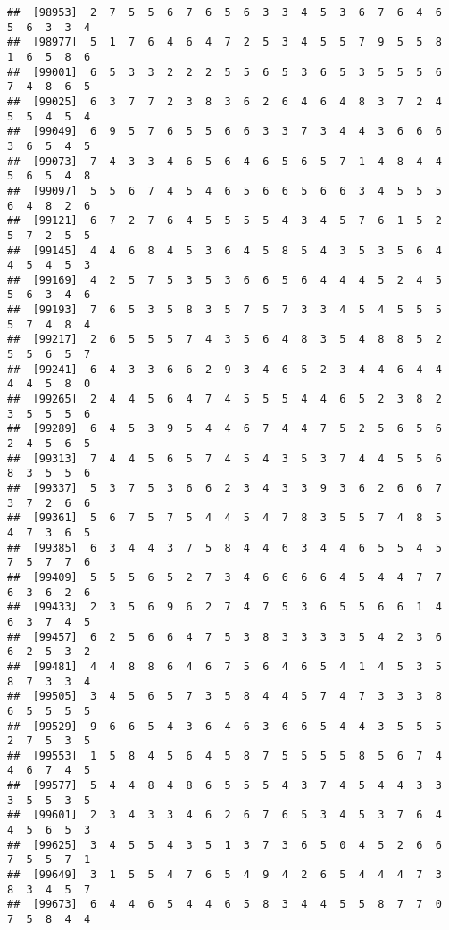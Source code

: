 \documentclass[
]{book}
\begin{document}
\begin{verbatim}
##  [98953]  2  7  5  5  6  7  6  5  6  3  3  4  5  3  6  7  6  4  6  5  6  3  3  4
##  [98977]  5  1  7  6  4  6  4  7  2  5  3  4  5  5  7  9  5  5  8  1  6  5  8  6
##  [99001]  6  5  3  3  2  2  2  5  5  6  5  3  6  5  3  5  5  5  6  7  4  8  6  5
##  [99025]  6  3  7  7  2  3  8  3  6  2  6  4  6  4  8  3  7  2  4  5  5  4  5  4
##  [99049]  6  9  5  7  6  5  5  6  6  3  3  7  3  4  4  3  6  6  6  3  6  5  4  5
##  [99073]  7  4  3  3  4  6  5  6  4  6  5  6  5  7  1  4  8  4  4  5  6  5  4  8
##  [99097]  5  5  6  7  4  5  4  6  5  6  6  5  6  6  3  4  5  5  5  6  4  8  2  6
##  [99121]  6  7  2  7  6  4  5  5  5  5  4  3  4  5  7  6  1  5  2  5  7  2  5  5
##  [99145]  4  4  6  8  4  5  3  6  4  5  8  5  4  3  5  3  5  6  4  4  5  4  5  3
##  [99169]  4  2  5  7  5  3  5  3  6  6  5  6  4  4  4  5  2  4  5  5  6  3  4  6
##  [99193]  7  6  5  3  5  8  3  5  7  5  7  3  3  4  5  4  5  5  5  5  7  4  8  4
##  [99217]  2  6  5  5  5  7  4  3  5  6  4  8  3  5  4  8  8  5  2  5  5  6  5  7
##  [99241]  6  4  3  3  6  6  2  9  3  4  6  5  2  3  4  4  6  4  4  4  4  5  8  0
##  [99265]  2  4  4  5  6  4  7  4  5  5  5  4  4  6  5  2  3  8  2  3  5  5  5  6
##  [99289]  6  4  5  3  9  5  4  4  6  7  4  4  7  5  2  5  6  5  6  2  4  5  6  5
##  [99313]  7  4  4  5  6  5  7  4  5  4  3  5  3  7  4  4  5  5  6  8  3  5  5  6
##  [99337]  5  3  7  5  3  6  6  2  3  4  3  3  9  3  6  2  6  6  7  3  7  2  6  6
##  [99361]  5  6  7  5  7  5  4  4  5  4  7  8  3  5  5  7  4  8  5  4  7  3  6  5
##  [99385]  6  3  4  4  3  7  5  8  4  4  6  3  4  4  6  5  5  4  5  7  5  7  7  6
##  [99409]  5  5  5  6  5  2  7  3  4  6  6  6  6  4  5  4  4  7  7  6  3  6  2  6
##  [99433]  2  3  5  6  9  6  2  7  4  7  5  3  6  5  5  6  6  1  4  6  3  7  4  5
##  [99457]  6  2  5  6  6  4  7  5  3  8  3  3  3  3  5  4  2  3  6  6  2  5  3  2
##  [99481]  4  4  8  8  6  4  6  7  5  6  4  6  5  4  1  4  5  3  5  8  7  3  3  4
##  [99505]  3  4  5  6  5  7  3  5  8  4  4  5  7  4  7  3  3  3  8  6  5  5  5  5
##  [99529]  9  6  6  5  4  3  6  4  6  3  6  6  5  4  4  3  5  5  5  2  7  5  3  5
##  [99553]  1  5  8  4  5  6  4  5  8  7  5  5  5  5  8  5  6  7  4  4  6  7  4  5
##  [99577]  5  4  4  8  4  8  6  5  5  5  4  3  7  4  5  4  4  3  3  3  5  5  3  5
##  [99601]  2  3  4  3  3  4  6  2  6  7  6  5  3  4  5  3  7  6  4  4  5  6  5  3
##  [99625]  3  4  5  5  4  3  5  1  3  7  3  6  5  0  4  5  2  6  6  7  5  5  7  1
##  [99649]  3  1  5  5  4  7  6  5  4  9  4  2  6  5  4  4  4  7  3  8  3  4  5  7
##  [99673]  6  4  4  6  5  4  4  6  5  8  3  4  4  5  5  8  7  7  0  7  5  8  4  4

\end{verbatim}
\end{document}
